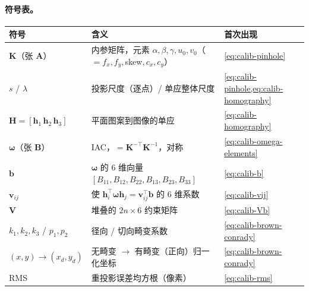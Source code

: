 \paragraph{符号表。}
\begin{table}[ht]\centering\small
\begin{tabular}{lll}
\toprule
符号 & 含义 & 首次出现 \\
\midrule
$\mathbf{K}$（张 $\mathbf{A}$）& 内参矩阵，元素 $\alpha,\beta,\gamma,u_0,v_0$（$=f_x,f_y,$skew$,c_x,c_y$）& \cref{eq:calib-pinhole} \\
$s$ / $\lambda$ & 投影尺度（逐点）/ 单应整体尺度 & \cref{eq:calib-pinhole,eq:calib-homography} \\
$\mathbf{H}=[\mathbf{h}_1\,\mathbf{h}_2\,\mathbf{h}_3]$ & 平面图案到图像的单应 & \cref{eq:calib-homography} \\
$\boldsymbol{\omega}$（张 $\mathbf{B}$）& IAC，$=\mathbf{K}^{-\top}\mathbf{K}^{-1}$，对称 & \cref{eq:calib-omega-elements} \\
$\mathbf{b}$ & $\boldsymbol{\omega}$ 的 $6$ 维向量 $[B_{11},B_{12},B_{22},B_{13},B_{23},B_{33}]$ & \cref{eq:calib-b} \\
$\mathbf{v}_{ij}$ & 使 $\mathbf{h}_i^\top\boldsymbol{\omega}\mathbf{h}_j=\mathbf{v}_{ij}^\top\mathbf{b}$ 的 $6$ 维系数 & \cref{eq:calib-vij} \\
$\mathbf{V}$ & 堆叠的 $2n\times6$ 约束矩阵 & \cref{eq:calib-Vb} \\
$k_1,k_2,k_3$ / $p_1,p_2$ & 径向 / 切向畸变系数 & \cref{eq:calib-brown-conrady} \\
$(x,y)\to(x_d,y_d)$ & 无畸变 $\to$ 有畸变（正向）归一化坐标 & \cref{eq:calib-brown-conrady} \\
RMS & 重投影误差均方根（像素）& \cref{eq:calib-rms} \\
\bottomrule
\end{tabular}
\end{table}


